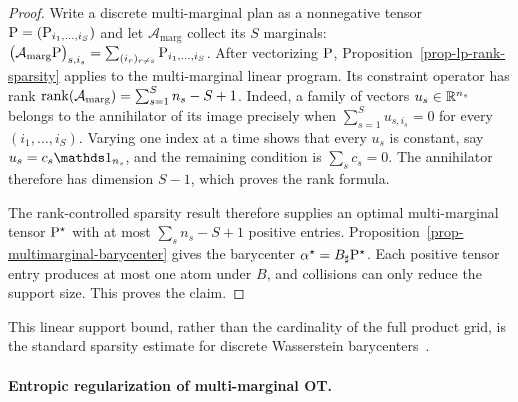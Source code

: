 \begin{proof}
	Write a discrete multi-marginal plan as a nonnegative tensor
	$\P=(\P_{i_1,\ldots,i_S})$ and let $\mathcal A_{\mathrm{marg}}$ collect its $S$ marginals:
	$\bigl(\mathcal A_{\mathrm{marg}}\P\bigr)_{s,i_s} = \sum_{(i_r)_{r\neq s}}\P_{i_1,\ldots,i_S}$.
	After vectorizing $\P$, Proposition~\ref{prop-lp-rank-sparsity} applies to the multi-marginal linear program. Its constraint operator has rank
	$\rank(\mathcal A_{\mathrm{marg}}) = \sum_{s=1}^S n_s-S+1$.
	Indeed, a family of vectors $u_s\in\RR^{n_s}$ belongs to the annihilator of its image precisely when
	$\sum_{s=1}^S u_{s,i_s}=0$ for every $(i_1,\ldots,i_S)$.
	Varying one index at a time shows that every $u_s$ is constant, say $u_s=c_s\ones_{n_s}$, and the remaining condition is $\sum_s c_s=0$. The annihilator therefore has dimension $S-1$, which proves the rank formula.

	The rank-controlled sparsity result therefore supplies an optimal multi-marginal tensor $\P^\star$ with at most $\sum_s n_s-S+1$ positive entries. Proposition~\ref{prop-multimarginal-barycenter} gives the barycenter $\al^\star=B_\sharp\P^\star$. Each positive tensor entry produces at most one atom under $B$, and collisions can only reduce the support size. This proves the claim.
\end{proof}

This linear support bound, rather than the cardinality of the full product grid, is the standard sparsity estimate for discrete Wasserstein barycenters~\cite{anderes2016discrete}.

\paragraph{Entropic regularization of multi-marginal OT.}

